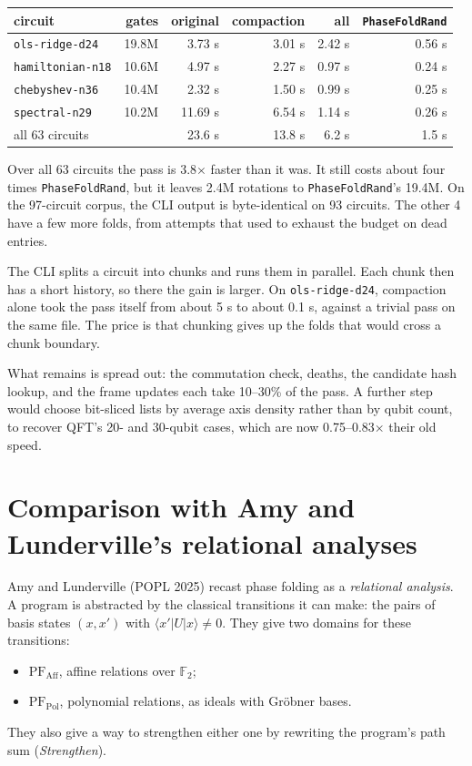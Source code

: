 \documentclass[11pt]{article}
\theoremstyle{definition}
\theoremstyle{remark}
\begin{document}
\begin{center}
\small
\begin{tabular}{@{}lrrrrr@{}}
\toprule
circuit & gates & original & compaction & all & \texttt{PhaseFoldRand} \\
\midrule
\texttt{ols-ridge-d24} & 19.8M & 3.73 s & 3.01 s & 2.42 s & 0.56 s \\
\texttt{hamiltonian-n18} & 10.6M & 4.97 s & 2.27 s & 0.97 s & 0.24 s \\
\texttt{chebyshev-n36} & 10.4M & 2.32 s & 1.50 s & 0.99 s & 0.25 s \\
\texttt{spectral-n29} & 10.2M & 11.69 s & 6.54 s & 1.14 s & 0.26 s \\
all 63 circuits & & 23.6 s & 13.8 s & 6.2 s & 1.5 s \\
\bottomrule
\end{tabular}
\end{center}

Over all 63 circuits the pass is 3.8$\times$ faster than it was. It still costs about four
times \texttt{PhaseFoldRand}, but it leaves 2.4M rotations to \texttt{PhaseFoldRand}'s
19.4M. On the 97-circuit corpus, the CLI output is byte-identical on 93 circuits. The other
4 have a few more folds, from attempts that used to exhaust the budget on dead entries.

The CLI splits a circuit into chunks and runs them in parallel. Each chunk then has a short
history, so there the gain is larger. On \texttt{ols-ridge-d24}, compaction alone took the
pass itself from about 5 s to about 0.1 s, against a trivial pass on the same file. The price is that chunking gives up the folds that would cross a
chunk boundary.

What remains is spread out: the commutation check, deaths, the candidate hash lookup, and
the frame updates each take 10--30\% of the pass. A further step would choose bit-sliced
lists by average axis density rather than by qubit count, to recover QFT's 20- and
30-qubit cases, which are now 0.75--0.83$\times$ their old speed.

\section{Comparison with Amy and Lunderville's relational analyses}\label{sec:al}

Amy and Lunderville (POPL 2025) recast phase folding as a \emph{relational analysis}. A
program is abstracted by the classical transitions it can make: the pairs of basis states
$(x, x')$ with $\langle x' | U | x\rangle \neq 0$. They give two domains for these
transitions:
\begin{itemize}[nosep]
  \item $\mathrm{PF}_{\mathrm{Aff}}$, affine relations over $\mathbb{F}_2$;
  \item $\mathrm{PF}_{\mathrm{Pol}}$, polynomial relations, as ideals with Gr\"obner bases.
\end{itemize}
They also give a way to strengthen either one by rewriting the program's path sum
(\emph{Strengthen}).
\end{document}
